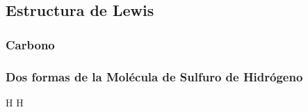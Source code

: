 \documentclass[12pt, a5paper]{article}
\begin{document}
\subsection*{Estructura de Lewis}
\subsubsection*{Carbono}

\subsubsection*{Dos formas de la Molécula de Sulfuro de Hidrógeno}
H  H \qquad\qquad {}

\end{document}
